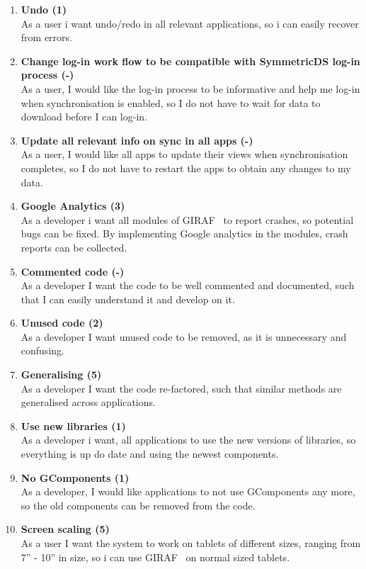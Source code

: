 \begin{enumerate}
	\item \textbf{Undo (1)}\\
	As a user i want undo/redo in all relevant applications, so i can easily recover from errors.
	
	\item \textbf{Change log-in work flow to be compatible with SymmetricDS log-in process (-)}\\
	As a user, I would like the log-in process to be informative and help me log-in when synchronisation is enabled, so I do not have to wait for data to download before I can log-in.
	
	\item \textbf{Update all relevant info on sync in all apps (-)}\\
	As a user, I would like all apps to update their views when synchronisation completes, so I do not have to restart the apps to obtain any changes to my data.
	
	\item \textbf{Google Analytics (3)}\\
	As a developer i want all modules of GIRAF~ to report crashes, so potential bugs can be fixed. By implementing Google analytics in the modules, crash reports can be collected.
	
	\item \textbf{Commented code (-)}\\
	As a developer I want the code to be well commented and documented, such that I can easily understand it and develop on it.
	
	\item \textbf{Unused code (2)}\\
	As a developer I want unused code to be removed, as it is unnecessary and confusing.
	
	\item \textbf{Generalising (5)}\\
	As a developer I want the code re-factored, such that similar methods are generalised across applications.
	
	\item \textbf{Use new libraries (1)}\\
	As a developer i want, all applications to use the new versions of libraries, so everything is up do date and using the newest components.
	
	\item \textbf{No GComponents (1)}\\
	As a developer, I would like applications to not use GComponents any more, so the old components can be removed from the code.
	
	\item \textbf{Screen scaling (5)}\\
	As a user I want the system to work on tablets of different sizes, ranging from 7” - 10” in size, so i can use GIRAF~ on normal sized tablets.
\end{enumerate}

